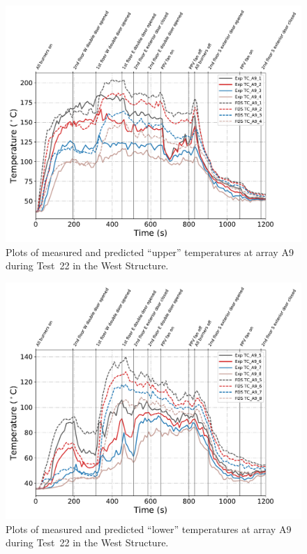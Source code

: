 \begin{figure}[!h]
	\centering
	\includegraphics[width=\columnwidth]{Figures/Plots/Validation/Temperature/Test_22_TC_A9_upper}
	\caption{Plots of measured and predicted ``upper'' temperatures at array A9 during Test~22 in the West Structure.}
	\label{fig:TCA9_upper_data_Test22}
\end{figure}
\begin{figure}[!h]
	\centering
	\includegraphics[width=\columnwidth]{Figures/Plots/Validation/Temperature/Test_22_TC_A9_lower}
	\caption{Plots of measured and predicted ``lower'' temperatures at array A9 during Test~22 in the West Structure.}
	\label{fig:TCA9_lower_data_Test22}
\end{figure}


